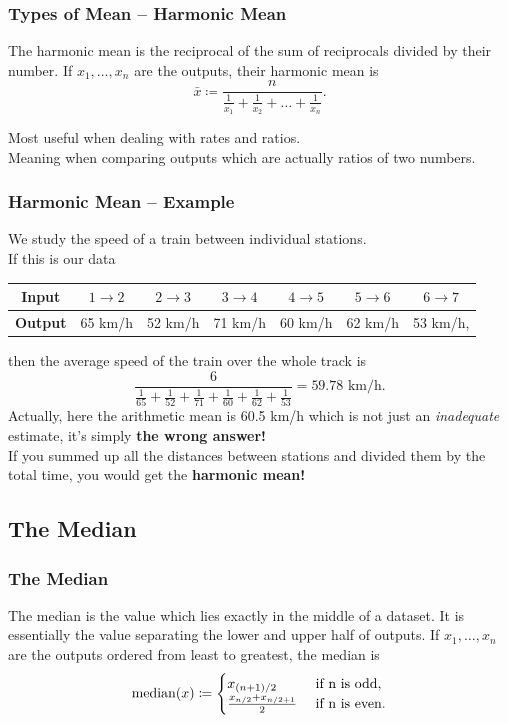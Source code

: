 \documentclass[aspectratio=169,11pt,svgnames,handout]{beamer}
\begin{document}
\begin{frame}
 \frametitle{Types of Mean -- Harmonic Mean}
 \begin{tcolorbox}[title=Harmonic Mean]
  The \alert{harmonic mean} is the reciprocal of the sum of reciprocals divided
  by their number. If $x_1,\ldots,x_n$ are the outputs, their harmonic mean is
  \[
   \bar{x} \coloneqq \frac{n}{\frac{1}{x_1} + \frac{1}{x_2}
   +\ldots+\frac{1}{x_n}}.
  \]
 \end{tcolorbox}
 \pause
 Most useful when dealing with \alert{rates} and \alert{ratios}.\\
 \pause
 Meaning when comparing outputs which are actually ratios of two numbers.
\end{frame}

\begin{frame}
 \frametitle{Harmonic Mean -- Example}
 We study the speed of a train between individual stations.\\
 \pause
 If this is our data
 \begin{center}
  \begin{tabular}{c|cccccc}
   \textbf{Input} & $1 \to 2$ & $2 \to 3$ & $3 \to 4$ & $4 \to 5$ & $5 \to 6$ &
   $6 \to 7$\\
   \midrule
   \textbf{Output} & 65 km/h & 52 km/h & 71 km/h & 60 km/h & 62 km/h & 53 km/h,
  \end{tabular}
 \end{center}
 then the average speed of the train over the whole track is
 \[
  \frac{6}{\frac{1}{65} + \frac{1}{52} + \frac{1}{71} + \frac{1}{60} +
  \frac{1}{62} + \frac{1}{53}} = 59.78 \text{ km/h}.
 \]
 \pause
 Actually, here the arithmetic mean is 60.5 km/h which is not just an
 \emph{inadequate} estimate, it's simply \textbf{the wrong answer!}\\
 \pause
 If you summed up all the distances between stations and divided them by the
 total time, you would get the \textbf{harmonic mean!}
\end{frame}

\subsection{The Median}
\begin{frame}
 \frametitle{}
 \subsectionpage
\end{frame}

\begin{frame}
 \frametitle{The Median}
 \begin{tcolorbox}[title=Median]
  The \alert{median} is the value which lies exactly in the middle of a dataset.
  It is essentially the value separating the lower and upper half of outputs. If
  $x_1,\ldots,x_n$ are the outputs \alert{ordered from least to greatest}, the
  median is
  \[
   \mathrm{median}(x) \coloneqq 
   \begin{cases}
    x_{(n+1) / 2} & \text{ if } $n$ \text{ is odd},\\
    \frac{x_{n / 2} + x_{n / 2 + 1}}{2} & \text{ if } $n$ \text{ is even}.
   \end{cases}
  \]
 \end{tcolorbox}
\end{frame}
\end{document}
